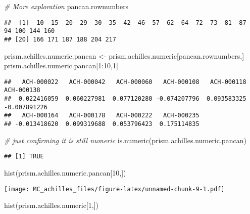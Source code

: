 \documentclass[
]{article}
\newenvironment{Shaded}{\begin{snugshade}}{\end{snugshade}}
\newcommand{\CommentTok}[1]{\textcolor[rgb]{0.56,0.35,0.01}{\textit{#1}}}
\newcommand{\DecValTok}[1]{\textcolor[rgb]{0.00,0.00,0.81}{#1}}
\newcommand{\FunctionTok}[1]{\textcolor[rgb]{0.00,0.00,0.00}{#1}}
\newcommand{\NormalTok}[1]{#1}
\newcommand{\OtherTok}[1]{\textcolor[rgb]{0.56,0.35,0.01}{#1}}
\newcommand{\SpecialCharTok}[1]{\textcolor[rgb]{0.00,0.00,0.00}{#1}}
\begin{document}
\begin{Shaded}
\begin{Highlighting}[]
\CommentTok{\# More exploration}
\NormalTok{pancan.rownumbers}
\end{Highlighting}
\end{Shaded}

\begin{verbatim}
##  [1]  10  15  20  29  30  35  42  46  57  62  64  72  73  81  87  94 100 144 160
## [20] 166 171 187 188 204 217
\end{verbatim}

\begin{Shaded}
\begin{Highlighting}[]
\NormalTok{prism.achilles.numeric.pancan }\OtherTok{\textless{}{-}}\NormalTok{ prism.achilles.numeric[pancan.rownumbers,]}
\NormalTok{prism.achilles.numeric.pancan[}\DecValTok{1}\SpecialCharTok{:}\DecValTok{10}\NormalTok{,}\DecValTok{1}\NormalTok{]}
\end{Highlighting}
\end{Shaded}

\begin{verbatim}
##   ACH-000022   ACH-000042   ACH-000060   ACH-000108   ACH-000118   ACH-000138 
##  0.022416059  0.060227981  0.077120280 -0.074207796  0.093583325 -0.007891226 
##   ACH-000164   ACH-000178   ACH-000222   ACH-000235 
## -0.013418620  0.099319688  0.053796423  0.175114835
\end{verbatim}

\begin{Shaded}
\begin{Highlighting}[]
\CommentTok{\# just confirming it is still numeric}
\FunctionTok{is.numeric}\NormalTok{(prism.achilles.numeric.pancan)}
\end{Highlighting}
\end{Shaded}

\begin{verbatim}
## [1] TRUE
\end{verbatim}

\begin{Shaded}
\begin{Highlighting}[]
\FunctionTok{hist}\NormalTok{(prism.achilles.numeric.pancan[}\DecValTok{10}\NormalTok{,])}
\end{Highlighting}
\end{Shaded}

\texttt{[image: MC\_achilles\_files/figure-latex/unnamed-chunk-9-1.pdf]}

\begin{Shaded}
\begin{Highlighting}[]
\FunctionTok{hist}\NormalTok{(prism.achilles.numeric[}\DecValTok{1}\NormalTok{,])}
\end{Highlighting}
\end{Shaded}
\end{document}
